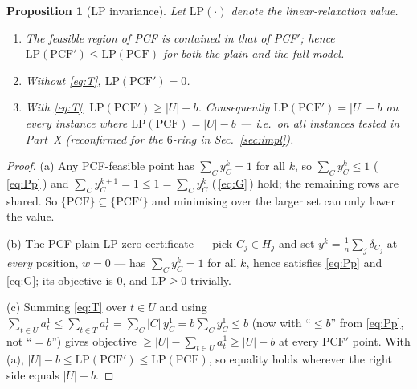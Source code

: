 \documentclass[11pt,a4paper]{article}
\theoremstyle{plain}
\newtheorem{proposition}[theorem]{Proposition}
\theoremstyle{definition}
\begin{document}
\begin{thmbox}
\begin{proposition}[LP invariance]\label{prop:pcfp-lp}
Let $\mathrm{LP}(\cdot)$ denote the linear-relaxation value.
\begin{enumerate}[label=(\alph*)]
\item The feasible region of PCF is contained in that of PCF$'$; hence
      $\mathrm{LP}(\mathrm{PCF}')\le\mathrm{LP}(\mathrm{PCF})$ for both the plain and the full model.
\item Without \eqref{eq:T}, $\mathrm{LP}(\mathrm{PCF}')=0$.
\item With \eqref{eq:T}, $\mathrm{LP}(\mathrm{PCF}')\ge|U|-b$. Consequently
      $\mathrm{LP}(\mathrm{PCF}')=|U|-b$ on every instance where $\mathrm{LP}(\mathrm{PCF})=|U|-b$
      --- i.e.\ on all instances tested in Part~X (reconfirmed for the $6$-ring in
      Sec.~\ref{sec:impl}).
\end{enumerate}
\end{proposition}
\end{thmbox}
\begin{proofbox}
\begin{proof}
(a) Any PCF-feasible point has $\sum_C y_C^k=1$ for all $k$, so $\sum_C y_C^k\le1$
(\,\eqref{eq:Pp}\,) and $\sum_C y_C^{k+1}=1\le1=\sum_C y_C^{k}$ (\,\eqref{eq:G}\,) hold; the
remaining rows are shared. So $\{\text{PCF}\}\subseteq\{\text{PCF}'\}$ and minimising over the
larger set can only lower the value.

(b) The PCF plain-LP-zero certificate --- pick $C_j\in H_j$ and set
$y^k=\frac1n\sum_j\delta_{C_j}$ at \emph{every} position, $w=0$ --- has $\sum_C y_C^k=1$ for all
$k$, hence satisfies \eqref{eq:Pp} and \eqref{eq:G}; its objective is $0$, and $\mathrm{LP}\ge0$
trivially.

(c) Summing \eqref{eq:T} over $t\in U$ and using
$\sum_{t\in U}a_t^1\le\sum_{t\in T}a_t^1=\sum_C|C|\,y_C^1=b\sum_C y_C^1\le b$ (now with
``$\le b$'' from \eqref{eq:Pp}, not ``$=b$'') gives objective
$\ge|U|-\sum_{t\in U}a_t^1\ge|U|-b$ at every PCF$'$ point. With (a),
$|U|-b\le\mathrm{LP}(\mathrm{PCF}')\le\mathrm{LP}(\mathrm{PCF})$, so equality holds wherever the
right side equals $|U|-b$.
\end{proof}
\end{proofbox}
\end{document}
